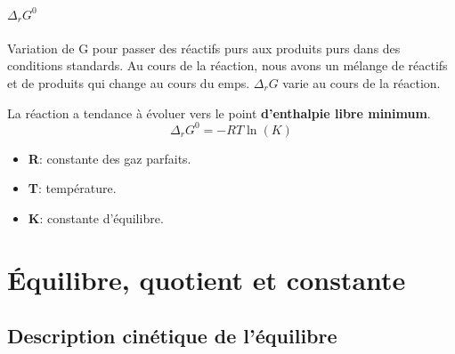 \documentclass[10pt,a4paper]{book}
\newcommand{\x}{$\times$ }
\begin{document}
\paragraph{\(\Delta_rG^0\)} Variation de G pour passer des réactifs purs aux produits purs dans des conditions standards. Au cours de la réaction, nous avons un mélange de réactifs et de produits qui change au cours du emps. \(\Delta_rG\) varie au cours de la réaction. \par
La réaction a tendance à évoluer vers le point \textbf{d’enthalpie libre minimum}.
\[\Delta_rG^0 = -RT\ln(K)\] \label{eq:GR0}
\begin{itemize}
\item \textbf{R}: constante des gaz parfaits.
\item \textbf{T}: température.
\item \textbf{K}: constante d’équilibre.
\end{itemize}

\section{Équilibre, quotient et constante} %

\subsection{Description cinétique de l'équilibre}
\end{document}
